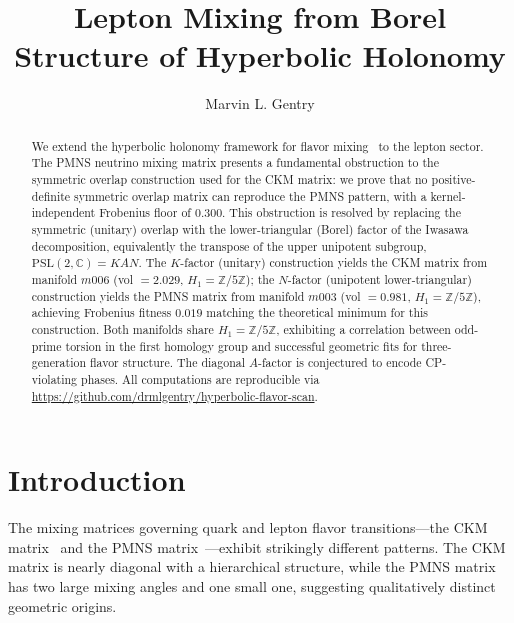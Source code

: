 \documentclass[epjc3]{svjour3}
\newcommand{\PSL}{\mathrm{PSL}(2,\mathbb{C})}
\newcommand{\Zfive}{\mathbb{Z}/5\mathbb{Z}}
\begin{document}
\title{Lepton Mixing from Borel Structure of Hyperbolic Holonomy}

\author{Marvin L. Gentry}


\begin{abstract}
We extend the hyperbolic holonomy framework for flavor mixing~\cite{Gentry:CKM}
to the lepton sector. The PMNS neutrino mixing matrix presents a fundamental
obstruction to the symmetric overlap construction used for the CKM matrix:
we prove that no positive-definite symmetric overlap matrix can reproduce the
PMNS pattern, with a kernel-independent Frobenius floor of $0.300$.
This obstruction is resolved by replacing the symmetric (unitary) overlap
with the lower-triangular (Borel) factor of the Iwasawa decomposition, equivalently the transpose of the upper unipotent subgroup,
$\PSL = KAN$. The $K$-factor (unitary) construction yields the CKM matrix
from manifold $m006$ (vol $= 2.029$, $H_1 = \Zfive$); the $N$-factor
(unipotent lower-triangular) construction yields the PMNS matrix from
manifold $m003$ (vol $= 0.981$, $H_1 = \Zfive$), achieving Frobenius
fitness $0.019$ matching the theoretical minimum for this construction.
Both manifolds share $H_1 = \Zfive$, exhibiting a correlation between
odd-prime torsion in the first homology group and successful geometric
fits for three-generation flavor structure. The diagonal $A$-factor is conjectured to encode CP-violating phases.
All computations are reproducible via
\url{https://github.com/drmlgentry/hyperbolic-flavor-scan}.
\end{abstract}


\maketitle

\section{Introduction}
\label{sec:intro}

The mixing matrices governing quark and lepton flavor transitions---the
CKM matrix~\cite{Cabibbo:1963yz,Kobayashi:1973fv} and the PMNS
matrix~\cite{Pontecorvo:1957cp,Maki:1962mu}---exhibit strikingly different
patterns. The CKM matrix is nearly diagonal with a hierarchical structure,
while the PMNS matrix has two large mixing angles and one small one,
suggesting qualitatively distinct geometric origins.
\end{document}
